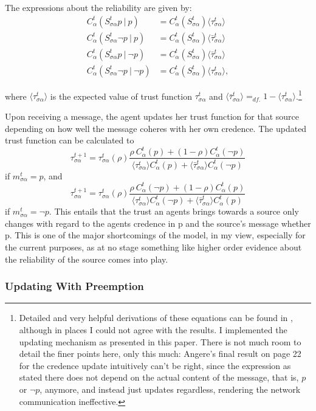 \documentclass[11pt, a4paper]{scrartcl}
\newcommand{\Stsa}{S^t_{\sigma\alpha}}
\newcommand{\sa}{{\sigma\alpha}}
\newcommand{\given}[1][]{\:#1\vert\:}
\renewcommand{\a}{\alpha}
\begin{document}
The expressions about the reliability are given by:
\begin{align*}
    C^t_\a (\Stsa p \given p) &= C^t_\a (\Stsa) \langle \tau^t_{\sa} \rangle \\
    C^t_\a (\Stsa \neg p \given p) &= C^t_\a (\Stsa) \langle \bar{\tau}^t_{\sa} \rangle \\
    C^t_\a (\Stsa p \given \neg p) &= C^t_\a (\Stsa) \langle \bar{\tau}^t_{\sa} \rangle \\
    C^t_\a (\Stsa \neg p \given \neg p) &= C^t_\a (\Stsa) \langle \tau^t_{\sa} \rangle,
\end{align*}

where $\langle \tau^t_{\sa} \rangle $ is the expected value of trust function $ \tau^t_{\sa} $ and ${\langle \bar{\tau}^t_{\sa} \rangle =_{df.} 1 - \langle \tau^t_{\sa} \rangle}$.\footnote{Detailed and very helpful derivations of these equations can be found in \textcite{Angere2010}, although in places I could not agree with the results. I implemented the updating mechanism as presented in this paper. There is not much room to detail the finer points here, only this much: Angere's final result on page 22 for the credence update intuitively can't be right, since the expression as stated there does not depend on the actual content of the message, that is, $p$ or $\neg p$, anymore, and instead just updates regardless, rendering the network communication ineffective.} 

Upon receiving a message, the agent updates her trust function for that source depending on how well the message coheres with her own credence. The updated trust function can be calculated to
\[
    \tau^{t+1}_\sa = \tau^t_\sa (\rho) \frac{\rho \: C^t_\a (p) + (1 - \rho) C^t_\a (\neg p)}
    {\langle \tau^t_\sa \rangle C^t_\a(p) + \langle \bar{\tau}^t_\sa \rangle C^t_\a(\neg p)}
\]
if $m^t_{\sa} = p$, and 
\[
    \tau^{t+1}_\sa = \tau^t_\sa (\rho) \frac{\rho \: C^t_\a (\neg p) + (1 - \rho) C^t_\a (p)}
    {\langle \tau^t_\sa \rangle C^t_\a(\neg p) + \langle \bar{\tau}^t_\sa \rangle C^t_\a(p)}
\]
if $m^t_{\sa} = \neg p$. This entails that the trust an agents brings towards a source only changes with regard to the agents credence in p and the source's message whether p. This is one of the major shortcomings of the model, in my view, especially for the current purposes, as at no stage something like higher order evidence about the reliability of the source comes into play. 

\subsubsection{Updating With Preemption}
\end{document}
